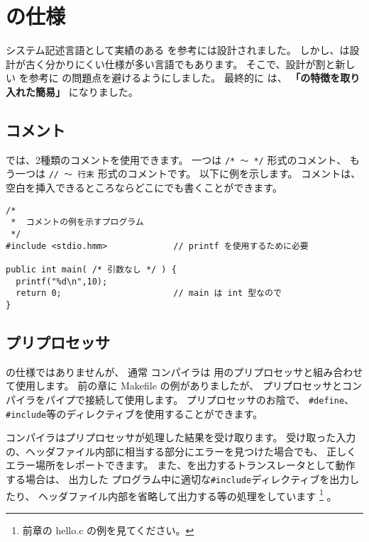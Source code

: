 % 
%
\chapter{\cmml の仕様}

システム記述言語として実績のある \cl を参考に\cmml は設計されました。
しかし、\cl は設計が古く分かりにくい仕様が多い言語でもあります。
そこで、設計が割と新しい \javal を参考に \cl の問題点を避けるようにしました。
最終的に \cmml は、
{\bf 「\javal の特徴を取り入れた簡易\cl」} になりました。

\section{コメント}

\cmml では、2種類のコメントを使用できます。
一つは \verb!/* 〜 */! 形式のコメント、
もう一つは \verb!// 〜 行末! 形式のコメントです。
以下に例を示します。
コメントは、空白を挿入できるところならどこにでも書くことができます。

\begin{mylist}
\begin{verbatim}
/*
 *  コメントの例を示すプログラム
 */
#include <stdio.hmm>             // printf を使用するために必要

public int main( /* 引数なし */ ) {
  printf("%d\n",10);
  return 0;                      // main は int 型なので
}
\end{verbatim}
\end{mylist}

\section{プリプロセッサ}

\cmml の仕様ではありませんが、
通常 \cmm コンパイラは \cl 用のプリプロセッサと組み合わせて使用します。
前の章に Makefile の例がありましたが、
プリプロセッサとコンパイラをパイプで接続して使用します。
プリプロセッサのお陰で、
\verb/#define/、\verb/#include/等のディレクティブを使用することができます。

\cmm コンパイラはプリプロセッサが処理した結果を受け取ります。
受け取った入力の、ヘッダファイル内部に相当する部分にエラーを見つけた場合でも、
正しくエラー場所をレポートできます。
また、\cl を出力するトランスレータとして動作する場合は、
出力した \cl プログラム中に適切な\verb/#include/ディレクティブを出力したり、
ヘッダファイル内部を省略して出力する等の処理をしています
\footnote{前章の hello.c の例を見てください。}
。

